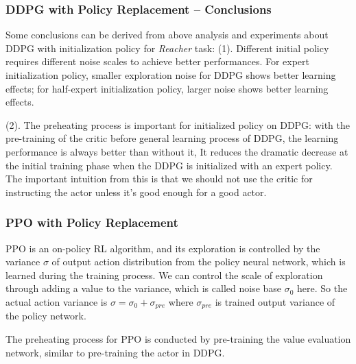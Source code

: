 \documentclass{article}
\begin{document}
\subsubsection{DDPG with Policy Replacement -- Conclusions}
Some conclusions can be derived from above analysis and experiments about DDPG with initialization policy for \textit{Reacher} task:
(1). Different initial policy requires different noise scales to achieve better performances. For expert initialization policy, smaller exploration noise for DDPG shows better learning effects; for half-expert initialization policy, larger noise shows better learning effects.

(2). The preheating process is important for initialized policy on DDPG: with the pre-training of the critic before general learning process of DDPG, the learning performance is always better than without it, It reduces the dramatic decrease at the initial training phase when the DDPG is initialized with an expert policy. The important intuition from this is that we should not use the critic for instructing the actor unless it's good enough for a good actor.


\subsubsection{PPO with Policy Replacement}
PPO is an on-policy RL algorithm, and its exploration is controlled by the variance $\sigma$ of output action distribution from the policy neural network, which is learned during the training process. We can control the scale of exploration through adding a value to the variance, which is called noise base $\sigma_0$ here. So the actual action variance is $\sigma =\sigma_0+\sigma_{pre}$ where $\sigma_{pre}$ is trained output variance of the policy network.

The preheating process for PPO is conducted by pre-training the value evaluation network, similar to pre-training the actor in DDPG. 
\end{document}
